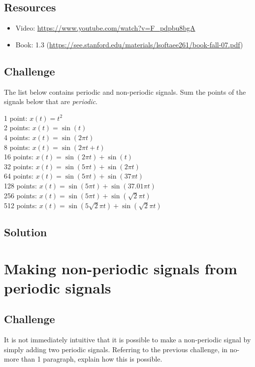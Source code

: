 \subsection*{Resources}
\begin{itemize}
    \item Video: \url{https://www.youtube.com/watch?v=F_pdpbu8bgA}
    \item Book: 1.3 (\url{https://see.stanford.edu/materials/lsoftaee261/book-fall-07.pdf})
\end{itemize}

\subsection*{Challenge}
The list below contains periodic and non-periodic signals. Sum the points of the signals below that are \emph{periodic}.

1 point: $x(t) = t^2$\\
2 points: $x(t) = \sin(t)$\\
4 points: $x(t) = \sin(2 \pi t)$\\
8 points: $x(t) = \sin(2 \pi t + t)$\\
16 points: $x(t) = \sin(2 \pi t) + \sin(t)$\\
32 points: $x(t) = \sin(5 \pi t) + \sin(2 \pi t)$\\
64 points: $x(t) = \sin(5 \pi t) + \sin(37 \pi t)$\\
128 points: $x(t) = \sin(5 \pi t) + \sin(37.01 \pi t)$\\
256 points: $x(t) = \sin(5 \pi t) + \sin(\sqrt{2} \pi t)$\\
512 points: $x(t) = \sin(5 \sqrt{2} \pi t) + \sin(\sqrt{2} \pi t)$

\subsection*{Solution}




\newpage
\section{Making non-periodic signals from periodic signals}

\subsection*{Challenge}
It is not immediately intuitive that it is possible to make a non-periodic signal by simply adding two periodic signals. Referring to the previous challenge, in no-more than 1 paragraph, explain how this is possible.

